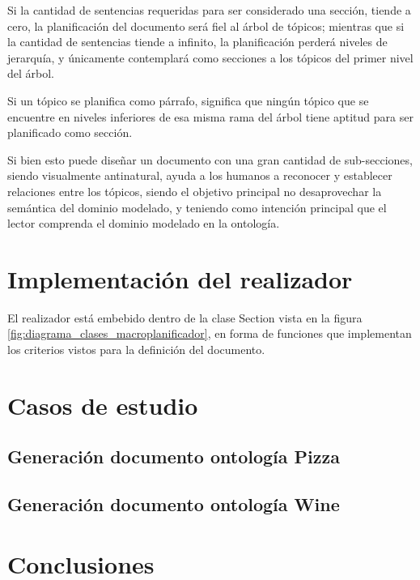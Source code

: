Si la cantidad de sentencias requeridas para ser considerado una sección, tiende a cero, la planificación del documento será fiel al árbol de tópicos; mientras que si la cantidad de sentencias tiende a infinito, la planificación perderá niveles de jerarquía, y únicamente contemplará como secciones a los tópicos del primer nivel del árbol.   

Si un tópico se planifica como párrafo, significa que ningún tópico que se encuentre en niveles inferiores de esa misma rama del árbol tiene aptitud para ser planificado como sección.

Si bien esto puede diseñar un documento con una gran cantidad de sub-secciones, siendo visualmente antinatural, ayuda a los humanos a reconocer y establecer relaciones entre los tópicos, siendo el objetivo principal no desaprovechar la semántica del dominio modelado, y teniendo como intención principal que el lector comprenda el dominio modelado en la ontología.

\section{Implementación del realizador}
El realizador está embebido dentro de la clase Section vista en la figura \ref{fig:diagrama_clases_macroplanificador}, en forma de funciones que implementan los criterios vistos para la definición del documento.


\section{Casos de estudio}

\subsection{Generación documento ontología Pizza}

\subsection{Generación documento ontología Wine}

\section{Conclusiones}

